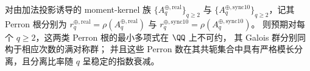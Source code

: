 \begin{conjecture}\label{conj:addition-collision-higher-q-full-symmetric}
对由加法投影诱导的 moment-kernel 族 \(\{A^{\oplus,\mathrm{real}}_q\}_{q\ge 2}\) 与 \(\{A^{\oplus,\mathrm{sync10}}_q\}_{q\ge 2}\)，记其 Perron 根分别为
\(r^{\oplus,\mathrm{real}}_q=\rho(A^{\oplus,\mathrm{real}}_q)\) 与 \(r^{\oplus,\mathrm{sync10}}_q=\rho(A^{\oplus,\mathrm{sync10}}_q)\)。
则预期对每个 \(q\ge 2\)，这两类 Perron 根的最小多项式在 \(\QQ\) 上不可约，
其 Galois 群分别同构于相应次数的满对称群；
并且这些 Perron 数在其共轭集合中具有严格模长分离，且分离比率随 \(q\) 呈稳定的指数衰减。
\end{conjecture}
